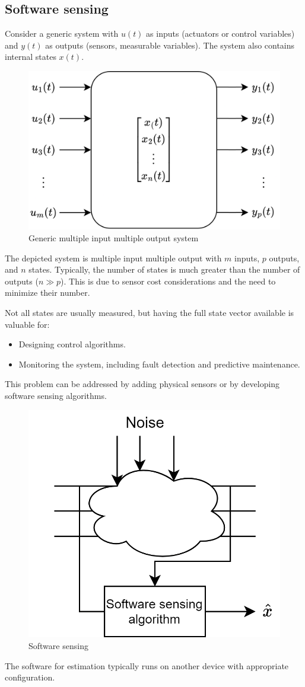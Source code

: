 \subsection{Software sensing}
Consider a generic system with $u(t)$ as inputs (actuators or control variables) and $y(t)$ as outputs (sensors, measurable variables). 
The system also contains internal states $x(t)$.
\begin{figure}[H]
    \centering
    \includegraphics[width=0.4\linewidth]{images/mimo.png}
    \caption{Generic multiple input multiple output system}
\end{figure}
The depicted system is multiple input multiple output with $m$ inputs, $p$ outputs, and $n$ states.
Typically, the number of states is much greater than the number of outputs ($n \gg p$).
This is due to sensor cost considerations and the need to minimize their number.

Not all states are usually measured, but having the full state vector available is valuable for:
\begin{itemize}
    \item Designing control algorithms.
    \item Monitoring the system, including fault detection and predictive maintenance.
\end{itemize}
This problem can be addressed by adding physical sensors or by developing software sensing algorithms.
\begin{figure}[H]
    \centering
    \includegraphics[width=0.4\linewidth]{images/sws.png}
    \caption{Software sensing}
\end{figure}
The software for estimation typically runs on another device with appropriate configuration.

